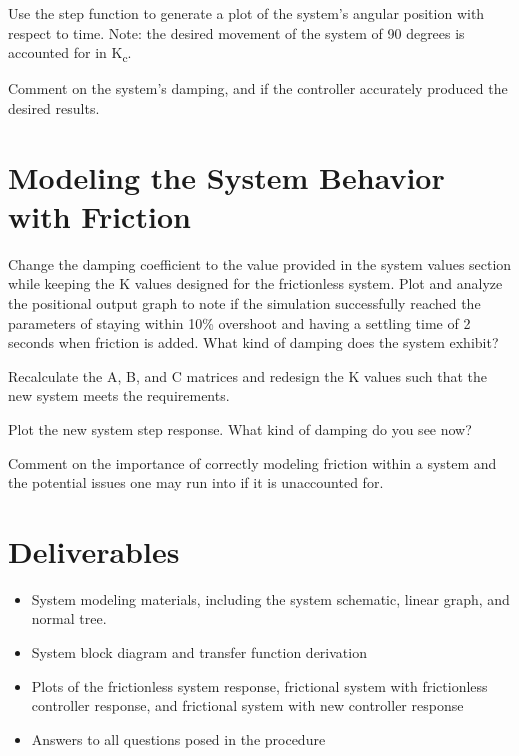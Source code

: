 \documentclass{homework}
\begin{document}
\question Use the step function to generate a plot of the system's angular position with respect to time. Note: the desired movement of the system of 90 degrees is accounted for in K\textsubscript{c}.

\question Comment on the system's damping, and if the controller accurately produced the desired results. 

\section*{Modeling the System Behavior with Friction}
\question Change the damping coefficient to the value provided in the system values section while keeping the K values designed for the frictionless system. Plot and analyze the positional output graph to note if the simulation successfully reached the parameters of staying within 10\% overshoot and having a settling time of 2 seconds when friction is added. What kind of damping does the system exhibit?

\question Recalculate the A, B, and C matrices and redesign the K values such that the new system meets the requirements. 

\question Plot the new system step response. What kind of damping do you see now? 

\question Comment on the importance of correctly modeling friction within a system and the potential issues one may run into if it is unaccounted for. 

\section*{Deliverables}

\begin{itemize}
  \item System modeling materials, including the system schematic, linear graph, and normal tree. 
  \item System block diagram and transfer function derivation 
  \item Plots of the frictionless system response, frictional system with frictionless controller response, and frictional system with new controller response
  \item Answers to all questions posed in the procedure
\end{itemize}
\newpage
\end{document}
